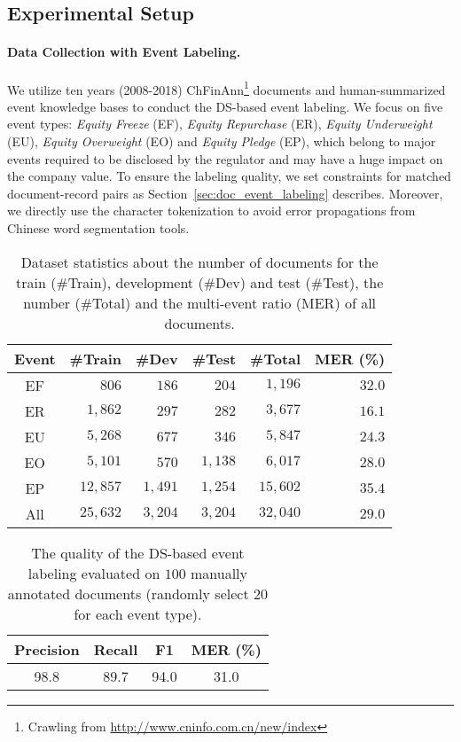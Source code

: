 \documentclass[11pt,a4paper]{article}
\begin{document}
\subsection{Experimental Setup}

\paragraph{Data Collection with Event Labeling.}
We utilize ten years (2008-2018) ChFinAnn\footnote{Crawling from \url{http://www.cninfo.com.cn/new/index}} documents and human-summarized event knowledge bases to conduct the DS-based event labeling.
We focus on five event types: \textit{Equity Freeze} (EF), \textit{Equity Repurchase} (ER),
\textit{Equity Underweight} (EU), \textit{Equity Overweight} (EO) and \textit{Equity Pledge} (EP),
which belong to major events required to be disclosed by the regulator and may have a huge impact on the company value.
To ensure the labeling quality, we set constraints for matched document-record pairs as Section~\ref{sec:doc_event_labeling} describes.
Moreover, we directly use the character tokenization to avoid error propagations from Chinese word segmentation tools.

\begin{table}[tb]\small
\centering
\addtolength{\tabcolsep}{-1.5pt}
\begin{tabular}{c r r r r r}
\toprule
\textbf{Event} & \textbf{\#Train} & \textbf{\#Dev} & \textbf{\#Test} & \textbf{\#Total} & \textbf{MER (\%)} \\
\midrule
 EF & $806$    & $186$   & $204$   & $1,196$  & $32.0$  \\
 ER & $1,862$  & $297$   & $282$   & $3,677$  & $16.1$  \\
 EU & $5,268$  & $677$   & $346$   & $5,847$  & $24.3$  \\
 EO & $5,101$  & $570$   & $1,138$ & $6,017$  & $28.0$  \\
 EP & $12,857$ & $1,491$ & $1,254$ & $15,602$ & $35.4$  \\ 
\midrule
All & $25,632$ & $3,204$ & $3,204$ & $32,040$ & $29.0$ \\
\bottomrule
\end{tabular}
\caption{Dataset statistics about the number of documents for the train (\#Train), development (\#Dev) and test (\#Test), the number (\#Total) and the multi-event ratio (MER) of all documents.}
\label{tab:dataset}
\end{table}

\begin{table}[tb]\small
\centering
\addtolength{\tabcolsep}{-1.5pt}
\begin{tabular}{c c c c}
\toprule
\textbf{Precision} & \textbf{Recall} & \textbf{F1} & \textbf{MER (\%)} \\
\midrule
98.8 & 89.7 & 94.0 & 31.0
\\
\bottomrule
\end{tabular}
\caption{The quality of the DS-based event labeling evaluated on $100$ manually annotated documents (randomly select $20$ for each event type).}
\label{tab:label_quality}
\end{table}
\end{document}
